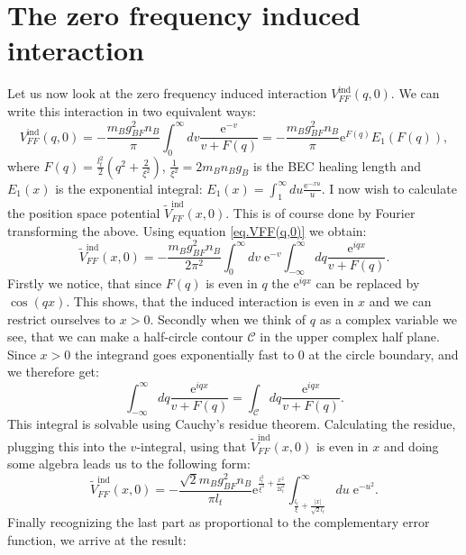 \section{The zero frequency induced interaction}
Let us now look at the zero frequency induced interaction $V_{FF}^\text{ind}(q,0)$. We can write this interaction in two equivalent ways:
\begin{equation}
V_{FF}^\text{ind}(q,0) = -\frac{m_Bg_{BF}^2n_B}{\pi}\int_{0}^\infty dv \frac{\text{e}^{-v}}{v+F(q)} = -\frac{m_Bg_{BF}^2n_B}{\pi} \text{e}^{F(q)} E_1(F(q)),
\label{eq.VFF(q,0)}
\end{equation}
where $F(q) = \frac{l_t^2}{2}\left(q^2+\frac{2}{\xi^2} \right)$, $\frac{1}{\xi^2} = 2m_Bn_Bg_B$ is the BEC healing length and $E_1(x)$ is the exponential integral: $E_1(x) = \int_1^\infty du \frac{\text{e}^{-xu}}{u}$. I now wish to calculate the position space potential $\tilde{V}_{FF}^\text{ind}(x,0)$. This is of course done by Fourier transforming the above. Using equation \eqref{eq.VFF(q,0)} we obtain:
\begin{equation}
\tilde{V}_{FF}^\text{ind}(x,0) = -\frac{m_Bg_{BF}^2n_B}{2\pi^2}\int_0^\infty dv\;  \text{e}^{-v}\int_{-\infty}^\infty dq \frac{\text{e}^{iqx}}{v+F(q)}.
\end{equation}
Firstly we notice, that since $F(q)$ is even in $q$ the $\text{e}^{iqx}$ can be replaced by $\cos(qx)$. This shows, that the induced interaction is even in $x$ and we can restrict ourselves to $x > 0$. Secondly when we think of $q$ as a complex variable we see, that we can make a half-circle contour $\mathcal{C}$ in the upper complex half plane. Since $x>0$ the integrand goes exponentially fast to 0 at the circle boundary, and we therefore get:
\begin{equation}
\int_{-\infty}^\infty dq \frac{\text{e}^{iqx}}{v+F(q)} = \int_\mathcal{C} dq  \frac{\text{e}^{iqx}}{v+F(q)}. \nonumber
\end{equation}
This integral is solvable using Cauchy's residue theorem. Calculating the residue, plugging this into the $v$-integral, using that $\tilde{V}_{FF}^\text{ind}(x,0)$ is even in $x$ and doing some algebra leads us to the following form:
\begin{equation}
\tilde{V}_{FF}^\text{ind}(x,0) = -\frac{\sqrt{2}m_Bg_{BF}^2n_B}{\pi l_t}\text{e}^{\frac{l_t^2}{\xi^2}+\frac{x^2}{2l_t^2}}\int_{\frac{l_t}{\xi}+\frac{|x|}{\sqrt{2}l_t}}^\infty du \; \text{e}^{-u^2}. \nonumber
\end{equation}
Finally recognizing the last part as proportional to the complementary error function, we arrive at the result:
